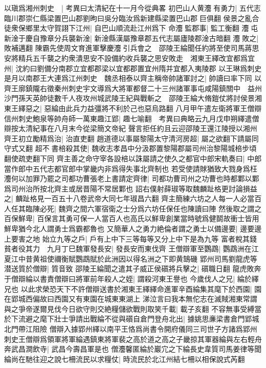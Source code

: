 以瑱爲湘州刺史　|{
	考異曰太清紀在十一月今從典畧}
初巴山人黄灋有勇力|{
	五代志臨川郡崇仁縣梁置巴山郡劉昫曰吳分臨汝爲新建縣梁置巴山郡巨俱翻}
侯景之亂合徒衆保鄉里太守賀詡下江州|{
	自巴山順流赴江州爲下}
命灋監郡事|{
	監工衡翻}
灋屯新淦于慶自豫章分兵襲新淦|{
	新淦縣漢屬豫章郡五代志屬廬陵郡淦古暗翻}
灋敗之|{
	敗補邁翻}
陳霸先使周文育進軍擊慶灋引兵會之　邵陵王綸聞任約將至使司馬蔣思安將精兵五千襲之約衆潰思安不設備約收兵襲之思安敗走　湘東王繹改宜都爲宜州|{
	沈約曰劉備分南郡立宜都郡梁以宜都郡置宜州隋并宜都入夷陵郡}
以王琳爲刺史　是月以南郡王大連爲江州刺史　魏丞相泰以齊主稱帝帥諸軍討之|{
	帥讀曰率下同}
以齊王廓鎮隴右徵秦州刺史宇文導爲大將軍都督二十三州諸軍事屯咸陽鎮關中　益州沙門孫天英帥徒數千人夜攻州城武陵王紀與戰斬之　邵陵王綸大脩鎧仗將討侯景湘東王繹惡之|{
	惡綸由此兵力益彊將不利於己也惡烏路翻}
八月甲午遣左衛將軍王僧辯信州刺史鮑泉等帥舟師一萬東趣江郢|{
	趣七喻翻　考異曰典略云九月戊申朔繹遣僧辯按太清紀事在八月末今從梁簡文帝紀}
聲言拒任約且云迎邵陵王還江陵授以湘州　齊王初立勵精爲治|{
	治直吏翻}
趙道德以事屬黎陽太守清河房超|{
	屬之欲翻下請屬同守式又翻}
超不書棓殺其使|{
	魏收志孝昌中分汲郡置黎陽郡屬司州治黎陽城棓步頃翻使疏吏翻下同}
齊主善之命守宰各設棓以誅屬請之使久之都官中郎宋軌奏曰|{
	中郎當作郎中五代志都官郎中掌畿内非爲得失事北齊制也}
若受使請賕猶致大戮身爲枉灋何以加罪乃罷之司都功曹張老上書請定齊律|{
	司都功曹司州之功曹也時都鄴以鄴爲司州治所按北齊主或居晋陽不常居鄴也}
詔右僕射薛琡等取魏麟趾格更討論損益之|{
	麟趾格見一百五十八卷武帝大同七年琡昌六翻}
齊主簡練六坊之人每一人必當百人任其臨陳必死|{
	魏齊之間六軍宿衛之士分爲六坊任保任也陳讀曰陣}
然後取之謂之百保鮮卑|{
	百保言其勇可保一人當百人也高氏以鮮卑創業當時號爲健鬬故衝士皆用鮮卑猶今北人謂勇士爲霸都魯也}
又簡華人之勇力絶倫者謂之勇士以備邊要|{
	邊要邊上要害之地}
始立九等之戶|{
	戶有上中下三等每等又分上中下是為九等}
富者稅其錢貧者役其力　九月丁巳魏軍發長安|{
	發長安而東伐齊}
王僧辯軍至鸚鵡|{
	鸚鵡洲在江夏江中昔黄祖使禰衡賦鸚鵡賦於此洲因以得名洲之下即黄鵠磯}
郢州司馬劉龍虎等潜送質於僧辯|{
	質音致}
邵陵王綸聞之遣其子威正侯礩將兵擊之|{
	礩職日翻}
龍虎敗奔于僧辯綸以書責僧辯曰將軍前年殺人之姪|{
	謂殺河東王譽也}
今歲伐人之兄|{
	綸於繹兄也}
以此求榮恐天下不許僧辯送書於湘東王繹繹命進軍辛酉綸集其麾下於西園|{
	園在郢城西偏故曰西園又有東園在城東東湖上}
涕泣言曰我本無佗志在滅賊湘東常謂與之爭帝遂爾見伐今日欲守則交絶糧儲欲戰則取笑千載|{
	載子亥翻}
不容無事受縛當於下流避之麾下壯士爭請出戰綸不從與礩自倉門登舟北出|{
	據姚思亷梁書倉門郢城北門帶江阻險}
僧辯入據郢州繹以南平王恪爲尚書令開府儀同三司世子方諸爲郢州刺史王僧辯爲領軍將軍綸遇鎮東將軍裴之高於道之高之子畿掠其軍器綸與左右輕舟奔武昌澗飲寺|{
	武昌今壽昌軍是也}
僧灋馨匿綸於巖宂之下綸長史韋質司馬姜律等聞綸尚在馳往迎之說七柵流民以求糧仗|{
	時流民於北江州結七柵以相保說式芮翻}
